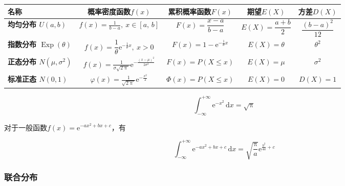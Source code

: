 \documentclass[UTF8,fontset=fandol,zihao=5]{ctexart}
\newcommand{\ee}{\mathrm{e}}
\newcommand{\dd}{\,\mathrm{d}}
\begin{document}
\begin{center}
  \begin{tabularx}{0.92\textwidth}{>{\bfseries}p{2.3cm}c c c c}
    \toprule
    \centering
    名称 & 概率密度函数$f(x)$ & 累积概率函数$F(x)$ & 期望$E(X)$ & 方差$D(X)$ \\
    \midrule
    \shortstack[c]{均匀分布\\$U(a,b)$} & $\displaystyle f(x)=\frac{1}{b-a},\ x\in\left[a,\,b\right]$ & $F(x)=\dfrac{x-a}{b-a}$ & $E(X)=\dfrac{a+b}{2}$ & $\dfrac{(b-a)^2}{12}$ \\
    \shortstack[c]{指数分布\\$\operatorname{Exp}(\theta)$} & $\displaystyle f(x)=\dfrac{1}{\theta} \ee^{-\frac{1}{\theta} x},\ x>0$ & $F(x)=1-\ee^{-\frac{1}{\theta} x}$ & $E(X)=\theta$ & $\theta^2$ \\
    \shortstack[c]{正态分布\\$N(\mu,\sigma^2)$} & $\displaystyle f(x)=\frac{1}{\sigma \sqrt{2 \uppi}} \ee^{-\frac{(x-\mu)^2}{2 \sigma^2}}$ & $F(x)=P(X\leq x)$ & $E(X)=\mu$ & $\sigma^2$ \\
    \shortstack[c]{标准正态\\$N(0,1)$} & $\displaystyle \varphi(x)=\frac{1}{\sqrt{2 \uppi}} \ee^{-\frac{x^2}{2}}$ & $\varPhi(x)=P(X\leq x)$ & $E(X)=0$ & $D(X)=1$ \\
    \bottomrule
  \end{tabularx}
\end{center}

\begin{methodbox}[Gauss积分公式]
  \[
  \int_{-\infty}^{+\infty} \ee^{-x^2}\dd x=\sqrt{\uppi}
  \]
  
  对于一般函数$f(x)=\ee^{-ax^2+bx+c}$，有

  \[
  \int_{-\infty}^{+\infty} \ee^{-ax^2+bx+c}\dd x=\sqrt{\frac{\uppi}{a}}\ee^{\frac{b^2}{4a}+c}
  \]
\end{methodbox}

\subsubsection{联合分布}
\end{document}
